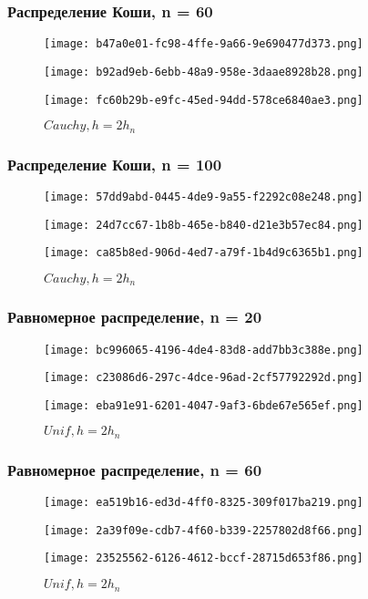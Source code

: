 \subsubsection{Распределение Коши, n = 60}
\begin{figure}[!htb]
  \texttt{[image: b47a0e01-fc98-4ffe-9a66-9e690477d373.png]}
  \caption{\(Cauchy, h=h_n/2\)}
\endminipage\hfill
{}
  \texttt{[image: b92ad9eb-6ebb-48a9-958e-3daae8928b28.png]}
  \caption{\(Cauchy, h=h_n\)}
\endminipage\hfill
{}
  \texttt{[image: fc60b29b-e9fc-45ed-94dd-578ce6840ae3.png]}
  \caption{\(Cauchy, h=2h_n\)}
\endminipage
\label{fig:cauch60}
\end{figure}
\newpage
\subsubsection{Распределение Коши, n = 100}
\begin{figure}[!htb]
  \texttt{[image: 57dd9abd-0445-4de9-9a55-f2292c08e248.png]}
  \caption{\(Cauchy, h=h_n/2\)}
\endminipage\hfill
{}
  \texttt{[image: 24d7cc67-1b8b-465e-b840-d21e3b57ec84.png]}
  \caption{\(Cauchy, h=h_n\)}
\endminipage\hfill
{}
  \texttt{[image: ca85b8ed-906d-4ed7-a79f-1b4d9c6365b1.png]}
  \caption{\(Cauchy, h=2h_n\)}
\endminipage
\label{fig:cauch100}
\end{figure}
\newpage
\subsubsection{Равномерное распределение, n = 20}
\begin{figure}[!htb]
  \texttt{[image: bc996065-4196-4de4-83d8-add7bb3c388e.png]}
  \caption{\(Unif, h=h_n/2\)}
\endminipage\hfill
{}
  \texttt{[image: c23086d6-297c-4dce-96ad-2cf57792292d.png]}
  \caption{\(Unif, h=h_n\)}
\endminipage\hfill
{}
  \texttt{[image: eba91e91-6201-4047-9af3-6bde67e565ef.png]}
  \caption{\(Unif, h=2h_n\)}
\endminipage
\label{fig:unif20}
\end{figure}
\subsubsection{Равномерное распределение, n = 60}
\begin{figure}[!htb]
  \texttt{[image: ea519b16-ed3d-4ff0-8325-309f017ba219.png]}
  \caption{\(Unif, h=h_n/2\)}
\endminipage\hfill
{}
  \texttt{[image: 2a39f09e-cdb7-4f60-b339-2257802d8f66.png]}
  \caption{\(Unif, h=h_n\)}
\endminipage\hfill
{}
  \texttt{[image: 23525562-6126-4612-bccf-28715d653f86.png]}
  \caption{\(Unif, h=2h_n\)}
\endminipage
 \label{fig:unif60}
\end{figure}
